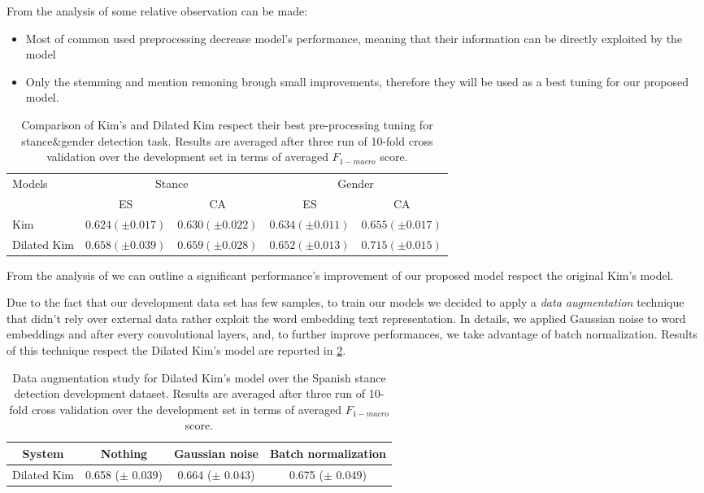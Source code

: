 From the analysis of  some relative observation can be made:
\begin{itemize}
\item Most of common used preprocessing decrease model's performance, meaning that their information can be directly exploited by the model
\item Only the stemming and mention remoning brough small improvements, therefore they will be used as a best tuning for our proposed model.
\end{itemize}



\begin{table}[t]
\footnotesize
\caption{Comparison of Kim's and Dilated Kim respect their best pre-processing tuning for stance\&gender detection task. Results are averaged after three run of 10-fold cross validation over the development set in terms of averaged $F_{1-macro}$ score.}
\label{tab:dilation}
\centering
\begin{tabular}{l|cc|cc}
\toprule
\hline
\multirow{2}{*}{Models}		& \multicolumn{2}{c}{Stance}	& \multicolumn{2}{c}{Gender}\\
\cline{2-5}
							& ES		& CA		& ES		& CA		\\
\hline
Kim							& $0.624 (\pm0.017)$ & $0.630 (\pm0.022)$ & $0.634 (\pm0.011)$ & $0.655 (\pm0.017)$	\\
Dilated Kim					& $0.658 (\pm0.039)$ & $0.659 (\pm0.028)$ & $0.652 (\pm0.013)$ & $0.715 (\pm0.015)$	\\
\hline
\bottomrule
\end{tabular}
\end{table}

From the analysis of  we can outline a significant performance's improvement of our proposed model respect the original Kim's model.


Due to the fact that our development data set has few samples, to train our models we decided to apply a \emph{data augmentation} technique that didn't rely over external data rather exploit the word embedding text representation. In details, we applied Gaussian noise to word embeddings and after every convolutional layers, and, to further improve performances, we take advantage of batch normalization.
Results of this technique respect the Dilated Kim's model are reported in \cref{tab:augmentation}.

\begin{table}[h]
\footnotesize
\caption{Data augmentation study for Dilated Kim's model over the Spanish stance detection development dataset. Results are averaged after three run of 10-fold cross validation over the development set in terms of averaged $F_{1-macro}$ score. }
\label{tab:augmentation}
\centering
\begin{tabular}{c|ccc}
\toprule
\hline
System		& Nothing	& Gaussian noise	& Batch normalization	\\
\hline
Dilated Kim	& 0.658 ($\pm$ 0.039) & 0.664 ($\pm$ 0.043)	& 0.675 ($\pm$ 0.049)	\\
\hline
\bottomrule
\end{tabular}
\end{table}


